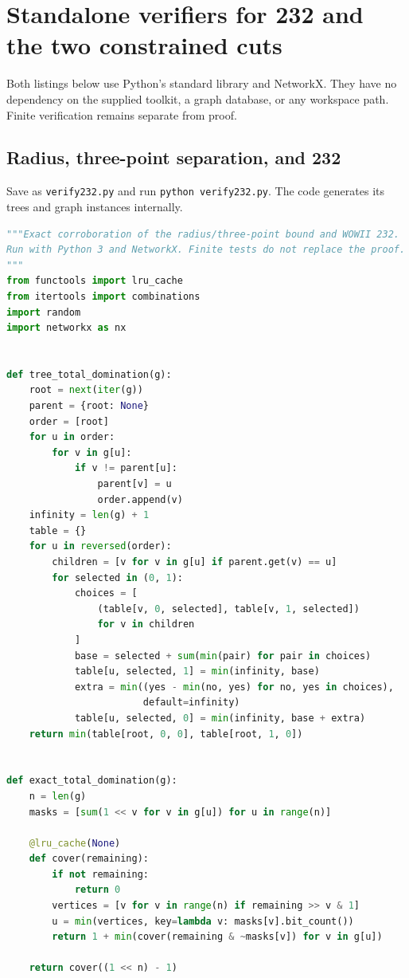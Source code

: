 \documentclass[11pt,a4paper]{article}
\theoremstyle{remark}
\begin{document}
\section{Standalone verifiers for 232 and the two constrained cuts}
\label{r9:programs}
Both listings below use Python's standard library and NetworkX. They
have no dependency on the supplied toolkit, a graph database, or any
workspace path. Finite verification remains separate from proof.

\subsection{Radius, three-point separation, and 232}
Save as \texttt{verify232.py} and run \texttt{python verify232.py}.
The code generates its trees and graph instances internally.
\begin{lstlisting}[language=Python]
"""Exact corroboration of the radius/three-point bound and WOWII 232.
Run with Python 3 and NetworkX. Finite tests do not replace the proof.
"""
from functools import lru_cache
from itertools import combinations
import random
import networkx as nx


def tree_total_domination(g):
    root = next(iter(g))
    parent = {root: None}
    order = [root]
    for u in order:
        for v in g[u]:
            if v != parent[u]:
                parent[v] = u
                order.append(v)
    infinity = len(g) + 1
    table = {}
    for u in reversed(order):
        children = [v for v in g[u] if parent.get(v) == u]
        for selected in (0, 1):
            choices = [
                (table[v, 0, selected], table[v, 1, selected])
                for v in children
            ]
            base = selected + sum(min(pair) for pair in choices)
            table[u, selected, 1] = min(infinity, base)
            extra = min((yes - min(no, yes) for no, yes in choices),
                        default=infinity)
            table[u, selected, 0] = min(infinity, base + extra)
    return min(table[root, 0, 0], table[root, 1, 0])


def exact_total_domination(g):
    n = len(g)
    masks = [sum(1 << v for v in g[u]) for u in range(n)]

    @lru_cache(None)
    def cover(remaining):
        if not remaining:
            return 0
        vertices = [v for v in range(n) if remaining >> v & 1]
        u = min(vertices, key=lambda v: masks[v].bit_count())
        return 1 + min(cover(remaining & ~masks[v]) for v in g[u])

    return cover((1 << n) - 1)



\end{lstlisting}
\end{document}

